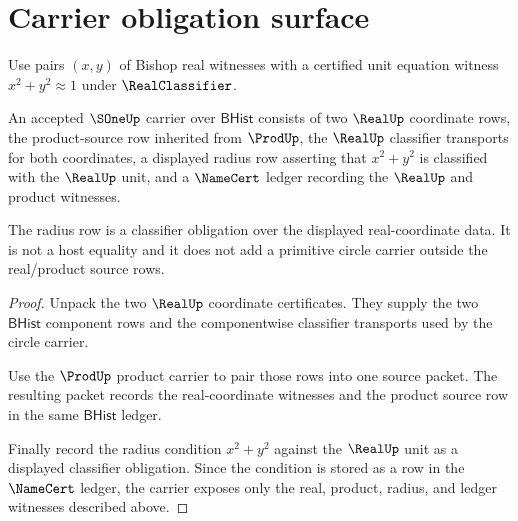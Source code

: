 \section{Carrier obligation surface}
\label{sec:s1-carrier}

\begin{definition}
\label{def:s1-carrier}
Use pairs $(x,y)$ of Bishop real witnesses with a certified unit equation witness $x^2 + y^2 \approx 1$ under $\RealClassifier$.
\end{definition}

\begin{theorem}
\label{thm:s1-root-obligation-surface}
An accepted $\SOneUp$ carrier over $\mathsf{BHist}$ consists of two $\RealUp$
coordinate rows, the product-source row inherited from $\ProdUp$, the
$\RealUp$ classifier transports for both coordinates, a displayed radius row
asserting that $x^2+y^2$ is classified with the $\RealUp$ unit, and a
$\NameCert$ ledger recording the $\RealUp$ and product witnesses.

The radius row is a classifier obligation over the displayed real-coordinate
data. It is not a host equality and it does not add a primitive circle carrier
outside the real/product source rows.
\end{theorem}
\begin{proof}
Unpack the two $\RealUp$ coordinate certificates. They supply the two
$\mathsf{BHist}$ component rows and the componentwise classifier transports
used by the circle carrier.

Use the $\ProdUp$ product carrier to pair those rows into one source packet.
The resulting packet records the real-coordinate witnesses and the product
source row in the same $\mathsf{BHist}$ ledger.

Finally record the radius condition $x^2+y^2$ against the $\RealUp$ unit as a
displayed classifier obligation. Since the condition is stored as a row in the
$\NameCert$ ledger, the carrier exposes only the real, product, radius, and
ledger witnesses described above.
\end{proof}


